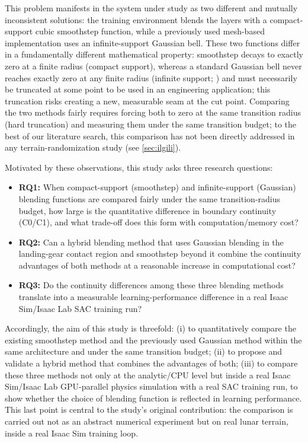 This problem manifests in the system under study as two different and
mutually inconsistent solutions: the training environment blends the
layers with a compact-support cubic smoothstep function, while a
previously used mesh-based implementation uses an infinite-support
Gaussian bell. These two functions differ in a fundamentally different
mathematical property: smoothstep decays to exactly zero at a finite
radius (compact support), whereas a standard Gaussian bell never reaches
exactly zero at any finite radius (infinite support;
\citep{hardy1971multiquadric}) and must necessarily be truncated at some
point to be used in an engineering application; this truncation risks
creating a new, measurable seam at the cut point. Comparing the two
methods fairly requires forcing both to zero at the same transition
radius (hard truncation) and measuring them under the same transition
budget; to the best of our literature search, this comparison has not
been directly addressed in any terrain-randomization study (see
\cref{sec:ilgili}).

Motivated by these observations, this study asks three research
questions:

\begin{itemize}
\item \textbf{RQ1:} When compact-support (smoothstep) and
infinite-support (Gaussian) blending functions are compared fairly under
the same transition-radius budget, how large is the quantitative
difference in boundary continuity (C0/C1), and what trade-off does this
form with computation/memory cost?
\item \textbf{RQ2:} Can a hybrid blending method that uses Gaussian
blending in the landing-gear contact region and smoothstep beyond it
combine the continuity advantages of both methods at a reasonable
increase in computational cost?
\item \textbf{RQ3:} Do the continuity differences among these three
blending methods translate into a measurable learning-performance
difference in a real Isaac Sim/Isaac Lab SAC training run?
\end{itemize}

Accordingly, the aim of this study is threefold: (i) to quantitatively
compare the existing smoothstep method and the previously used Gaussian
method within the same architecture and under the same transition
budget; (ii) to propose and validate a hybrid method that combines the
advantages of both; (iii) to compare these three methods not only at the
analytic/CPU level but inside a real Isaac Sim/Isaac Lab GPU-parallel
physics simulation with a real SAC training run, to show whether the
choice of blending function is reflected in learning performance. This
last point is central to the study's original contribution: the
comparison is carried out not as an abstract numerical experiment but
on real lunar terrain, inside a real Isaac Sim training loop.

